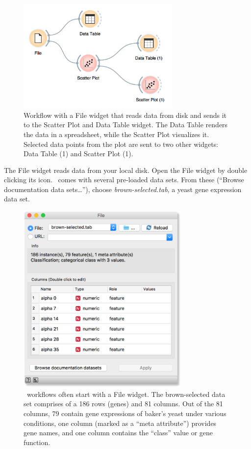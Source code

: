 \begin{figure}[h]
  \centering
  \includegraphics[width=80mm]{workflow-fig2.png}%
  \caption{Workflow with a File widget that reads data from disk and sends it to the Scatter Plot and Data Table widget. The Data Table renders the data in a spreadsheet, while the Scatter Plot visualizes it. Selected data points from the plot are sent to two other widgets: Data Table (1) and Scatter Plot (1).}
  \label{fig:workflow-fig2}
\end{figure}

The File widget reads data from your local disk. Open the File widget by double clicking its icon. \mutation\  comes with several pre-loaded data sets. From these (“Browse documentation data sets…”), choose \textit{brown-selected.tab}, a yeast gene expression data set.

\begin{figure}[h]
  \centering
  \includegraphics[width=85mm]{workflow-fig3.png}%
  \caption{\mutation\  workflows often start with a File widget. The brown-selected data set comprises of a 186 rows (genes) and 81 columns. Out of the 81 columns, 79 contain gene expressions of baker’s yeast under various conditions, one column (marked as a “meta attribute”) provides gene names, and one column contains the “class” value or gene function.}
  \label{fig:workflow-fig3}
\end{figure}

